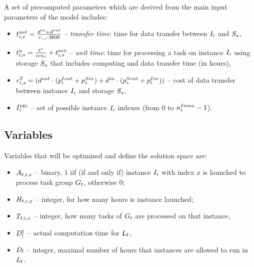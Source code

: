 {    A set of precomputed parameters which are derived from the main input parameters of the model includes:
    \begin{itemize}
        \item $t^{net}_{i,s} = \frac{d^{in}+d^{out}}{r_{i,s} \cdot 3600}$ -- {\em transfer time}: time for data transfer between
        $I_i$ and $S_s$,
        \item $\label{unitTime}\unitTime_{i,s} = \frac{\execTime}{\ccu_i} + \transferTime_{i,s}$ -- {\em unit time}: time for processing a task
        on instance $I_i$ using storage $S_s$ that includes computing and
        data transfer time (in hours),
        \item $c^T_{i,s} = (d^{out} \cdot
             (p^{Iout}_i + p^{Sin}_s) +
             d^{in} \cdot (p^{Sout}_s+p^{Iin}_i)) $ -- cost of data transfer between instance
        $I_i$ and storage $S_s$,
        \item $I^{idx}_i$ -- set of possible instance $I_i$ indexes (from $0$ to $n^{Imax}_i - 1$).
    \end{itemize}
   
   \subsection{Variables}
   \label{sec:varialbes}
    Variables that will be optimized and define the solution space are:
    \begin{itemize}
        \item $A_{t,i,x}$ -- binary, $1$ iif (if and only if) instance $I_i$ with index $x$ is launched to process task group $G_t$, otherwise $0$;
        \item $H_{t,i,x}$ -- integer, for how many hours is instance launched;
        \item $T_{t,i,x}$ -- integer, how many tasks of $G_t$ are processed on that instance,
        \item $D^t_l$ -- actual computation time for $L_l$,
        \item $D_l$ -- integer, maximal number of hours that instances are allowed to run in $L_l$.
    \end{itemize}
    
}

